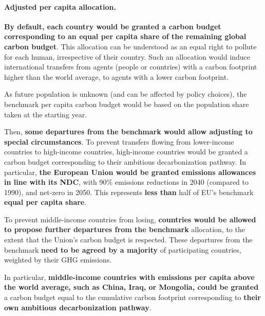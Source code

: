 \documentclass[12pt,english]{article}
\begin{document}
\paragraph{Adjusted per capita allocation.}
\textbf{By default, each country would be granted a carbon budget corresponding to an equal per capita share of the remaining global carbon budget}. This allocation can be understood as an equal right to pollute for each human, irrespective of their country. Such an allocation would induce international transfers from agents (people or countries) with a carbon footprint higher than the world average, to agents with a lower carbon footprint.

As future population is unknown (and can be affected by policy choices), the benchmark per capita carbon budget would be based on the population share taken at the starting year. %

Then, \textbf{some departures from the benchmark would allow adjusting to special circumstances}. To prevent transfers flowing from lower-income countries to high-income countries, high-income countries would be granted a carbon budget corresponding to their ambitious decarbonization pathway. In particular, \textbf{the European Union would be granted emissions allowances in line with its NDC}, with 90\% emissions reductions in 2040 (compared to 1990), and net-zero in 2050. This represents \textbf{less than} half of EU's benchmark \textbf{equal per capita share}.

To prevent middle-income countries from losing, %
\textbf{countries would be allowed to propose further departures from the benchmark} allocation, to the extent that the Union's carbon budget is respected. These departures from the benchmark \textbf{need to be agreed by a majority} of participating countries, weighted by their GHG emissions. %

In particular, \textbf{middle-income countries with emissions per capita above the world average, such as China, Iraq, or Mongolia, could be granted} a carbon budget equal to the cumulative carbon footprint corresponding to \textbf{their own ambitious decarbonization pathway}.
\end{document}
